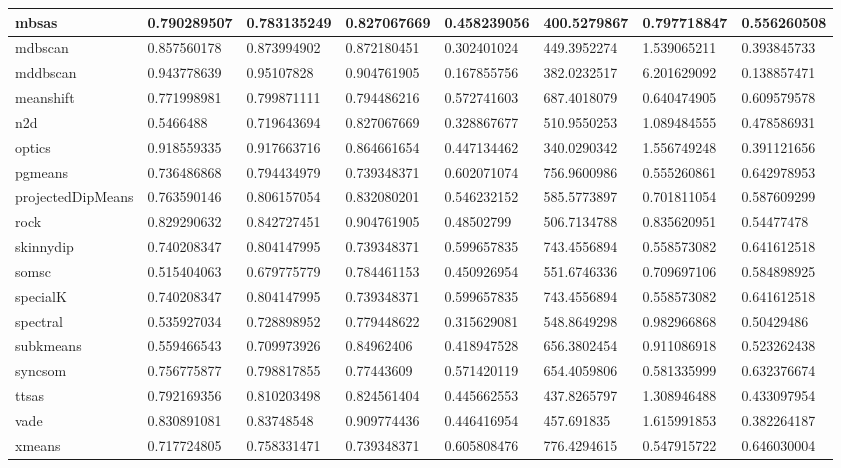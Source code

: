 \begin{table}[H]
\begin{tabular}{|l|l|l|l|l|l|l|l|}
\hline
mbsas & 0.790289507 & 0.783135249 & 0.827067669 & 0.458239056 & 400.5279867 & 0.797718847 & 0.556260508 \\
\hline
mdbscan & 0.857560178 & 0.873994902 & 0.872180451 & 0.302401024 & 449.3952274 & 1.539065211 & 0.393845733 \\
\hline
mddbscan & 0.943778639 & 0.95107828 & 0.904761905 & 0.167855756 & 382.0232517 & 6.201629092 & 0.138857471 \\
\hline
meanshift & 0.771998981 & 0.799871111 & 0.794486216 & 0.572741603 & 687.4018079 & 0.640474905 & 0.609579578 \\
\hline
n2d & 0.5466488 & 0.719643694 & 0.827067669 & 0.328867677 & 510.9550253 & 1.089484555 & 0.478586931 \\
\hline
optics & 0.918559335 & 0.917663716 & 0.864661654 & 0.447134462 & 340.0290342 & 1.556749248 & 0.391121656 \\
\hline
pgmeans & 0.736486868 & 0.794434979 & 0.739348371 & 0.602071074 & 756.9600986 & 0.555260861 & 0.642978953 \\
\hline
projectedDipMeans & 0.763590146 & 0.806157054 & 0.832080201 & 0.546232152 & 585.5773897 & 0.701811054 & 0.587609299 \\
\hline
rock & 0.829290632 & 0.842727451 & 0.904761905 & 0.48502799 & 506.7134788 & 0.835620951 & 0.54477478 \\
\hline
skinnydip & 0.740208347 & 0.804147995 & 0.739348371 & 0.599657835 & 743.4556894 & 0.558573082 & 0.641612518 \\
\hline
somsc & 0.515404063 & 0.679775779 & 0.784461153 & 0.450926954 & 551.6746336 & 0.709697106 & 0.584898925 \\
\hline
specialK & 0.740208347 & 0.804147995 & 0.739348371 & 0.599657835 & 743.4556894 & 0.558573082 & 0.641612518 \\
\hline
spectral & 0.535927034 & 0.728898952 & 0.779448622 & 0.315629081 & 548.8649298 & 0.982966868 & 0.50429486 \\
\hline
subkmeans & 0.559466543 & 0.709973926 & 0.84962406 & 0.418947528 & 656.3802454 & 0.911086918 & 0.523262438 \\
\hline
syncsom & 0.756775877 & 0.798817855 & 0.77443609 & 0.571420119 & 654.4059806 & 0.581335999 & 0.632376674 \\
\hline
ttsas & 0.792169356 & 0.810203498 & 0.824561404 & 0.445662553 & 437.8265797 & 1.308946488 & 0.433097954 \\
\hline
vade & 0.830891081 & 0.83748548 & 0.909774436 & 0.446416954 & 457.691835 & 1.615991853 & 0.382264187 \\
\hline
xmeans & 0.717724805 & 0.758331471 & 0.739348371 & 0.605808476 & 776.4294615 & 0.547915722 & 0.646030004 \\
\hline
\end{tabular}
\end{table}


